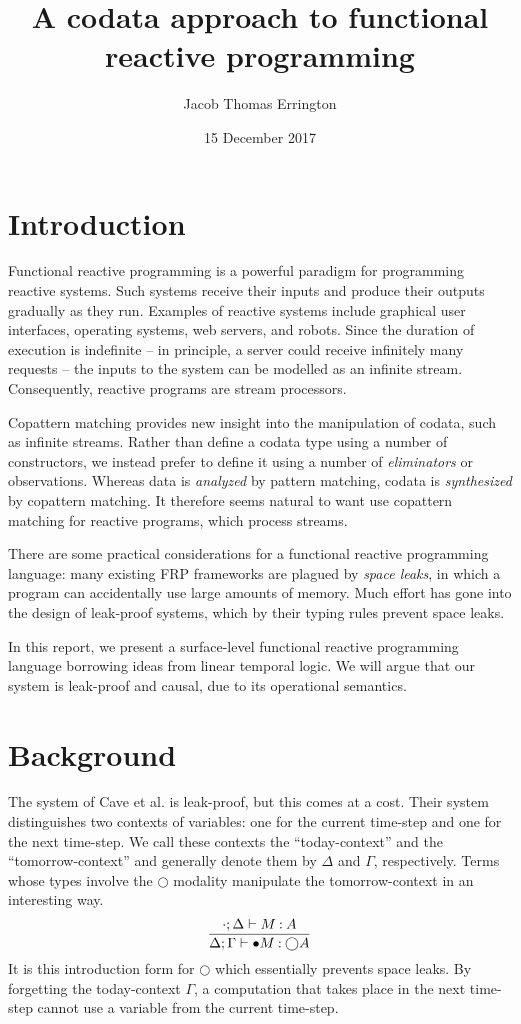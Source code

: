 \documentclass[11pt]{article}
\author{Jacob Thomas Errington}
\title{A codata approach to functional reactive programming}
\date{15 December 2017}
\renewcommand{\circle}{\bigcirc}
\begin{document}
\maketitle

\section{Introduction}

Functional reactive programming\cite{frp-hudak} is a powerful paradigm for
programming reactive systems.
Such systems receive their inputs and produce their outputs gradually as they
run. Examples of reactive systems include graphical user interfaces,
operating systems, web servers, and robots.
Since the duration of execution is indefinite -- in principle, a server could
receive infinitely many requests -- the inputs to the system can be modelled as
an infinite stream.
Consequently, reactive programs are stream processors.

Copattern matching\cite{copatterns} provides new insight into the manipulation
of codata, such as infinite streams.
Rather than define a codata type using a number of constructors, we instead
prefer to define it using a number of \emph{eliminators} or observations.
Whereas data is \emph{analyzed} by pattern matching, codata is
\emph{synthesized} by copattern matching.
%
It therefore seems natural to want use copattern matching for reactive
programs, which process streams.

There are some practical considerations for a functional reactive programming
language: many existing FRP frameworks are plagued by \emph{space leaks}, in
which a program can accidentally use large amounts of memory.
Much effort has gone into the design of leak-proof
systems\cite{ltl,neelk1,neelk2,neelk3}, which by their typing rules prevent
space leaks.

In this report, we present a surface-level functional reactive programming
language borrowing ideas from linear temporal logic\cite{pnueli}.
We will argue that our system is leak-proof and causal, due to its operational
semantics.

\section{Background}
\label{sec:background}

The system of Cave et al.\cite{ltl} is leak-proof, but this comes at a cost.
Their system distinguishes two contexts of variables: one for the current
time-step and one for the next time-step. We call these contexts the
``today-context'' and the ``tomorrow-context'' and generally denote them by
$\Delta$ and $\Gamma$, respectively.
Terms whose types involve the $\circle$ modality manipulate the
tomorrow-context in an interesting way.
%
\begin{equation*}
  \infer{
    \Delta; \Gamma \proves \bullet M \hastype \circle A
  }{
    \cdot; \Delta \proves M \hastype A
  }
\end{equation*}
%
It is this introduction form for $\circle$ which essentially prevents space
leaks. By forgetting the today-context $\Gamma$, a computation that takes place
in the next time-step cannot use a variable from the current time-step.
\end{document}
